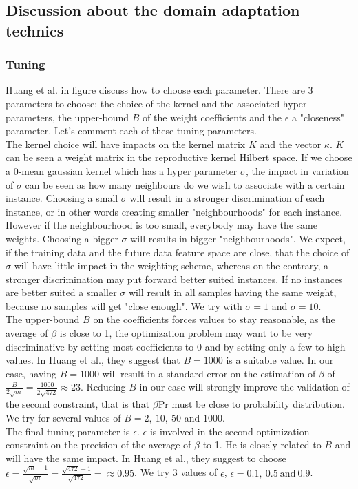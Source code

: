 \documentclass{article}
\newcommand{\PR}{\text{Pr}}
\begin{document}
\subsection{Discussion about the domain adaptation technics}



\subsubsection{Tuning}

Huang et al. in figure \cite{KMM} discuss how to choose each parameter. There are 3 parameters to choose: the choice of the kernel and the associated hyper-parameters, the upper-bound $B$ of the weight coefficients and the $\epsilon$ a "closeness" parameter. Let’s comment each of these tuning parameters. \\
The kernel choice will have impacts on the kernel matrix $K$ and the vector $\kappa$. $K$ can be seen a weight matrix in the reproductive kernel Hilbert space. If we choose a 0-mean gaussian kernel which has a hyper parameter $\sigma$, the impact in variation of $\sigma$ can be seen as how many neighbours do we wish to associate with a certain instance. Choosing a small $\sigma$ will result in a stronger discrimination of each instance, or in other words creating smaller "neighbourhoods" for each instance. However if the neighbourhood is too small, everybody may have the same weights. Choosing a bigger $\sigma$ will results in bigger "neighbourhoods". We expect, if the training data and the future data feature space are close, that the choice of $\sigma$ will have little impact in the weighting scheme, whereas on the contrary, a stronger discrimination may put forward better suited instances. If no instances are better suited a smaller $\sigma$ will result in all samples having the same weight, because no samples will get "close enough". We try with $\sigma=1$ and $\sigma=10$. \\
The upper-bound $B$ on the coefficients forces values to stay reasonable, as the average of $\beta$ is close to 1, the optimization problem may want to be very discriminative by setting most coefficients to 0 and by setting only a few to high values. In Huang et al., they suggest that $B=1000$ is a suitable value. In our case, having $B=1000$ will result in a standard error on the estimation of $\beta$ of $\frac{B}{2\sqrt{m}}=\frac{1000}{2\sqrt{472}} \approx 23 $. Reducing $B$ in our case will strongly improve the validation of the second constraint, that is that $\beta\PR$ must be close to probability distribution. We try for several values of $B=2,\ 10, \ 50$ and $1000$. \\
The final tuning parameter is $\epsilon$. $\epsilon$ is involved in the second optimization constraint on the precision of the average of $\beta$ to 1. He is closely related to $B$ and will have the same impact. In Huang et al., they suggest to choose $\epsilon = \frac{\sqrt{m}-1}{\sqrt{m}}= \frac{\sqrt{472}-1}{\sqrt{472}}=\approx 0.95$. We try 3 values of $\epsilon$, $\epsilon = 0.1, \ 0.5 \ \text{and} \ 0.9$.
\end{document}
